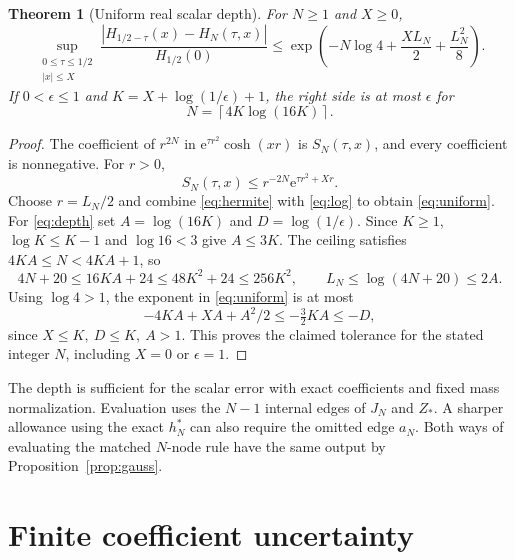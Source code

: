 \documentclass[11pt]{article}
\numberwithin{equation}{section}
\newtheorem{theorem}{Theorem}[section]
\newcommand{\ee}{\mathrm e}
\begin{document}
\begin{theorem}[Uniform real scalar depth]\label{thm:depth}
For \(N\ge1\) and \(X\ge0\),
\begin{equation}\label{eq:uniform}
 \sup_{\substack{0\le\tau\le 1/2\\ |x|\le X}}
 \frac{|H_{1/2-\tau}(x)-H_N(\tau,x)|}{H_{1/2}(0)}
 \le \exp\left(-N\log4+\frac{XL_N}{2}+\frac{L_N^2}{8}\right).
\end{equation}
If \(0<\epsilon\le1\) and \(K=X+\log(1/\epsilon)+1\), the
right side is at most \(\epsilon\) for
\begin{equation}\label{eq:depth}
 N=\left\lceil4K\log(16K)\right\rceil .
\end{equation}
\end{theorem}
\begin{proof}
The coefficient of \(r^{2N}\) in \(\ee^{\tau r^2}\cosh(xr)\)
is \(S_N(\tau,x)\), and every coefficient is nonnegative.
For \(r>0\),
\[
 S_N(\tau,x)\le r^{-2N}\ee^{\tau r^2+Xr}.
\]
Choose \(r=L_N/2\) and combine \eqref{eq:hermite} with
\eqref{eq:log} to obtain \eqref{eq:uniform}. For
\eqref{eq:depth} set \(A=\log(16K)\) and \(D=\log(1/\epsilon)\).
Since \(K\ge1\), \(\log K\le K-1\) and \(\log16<3\) give
\(A\le3K\). The ceiling satisfies \(4KA\le N<4KA+1\), so
\[
 4N+20\le16KA+24\le48K^2+24\le256K^2,\qquad
 L_N\le\log(4N+20)\le 2A .
\]
Using \(\log4>1\), the exponent in \eqref{eq:uniform}
is at most
\[
 -4KA+XA+A^2/2\le-\tfrac32 KA\le-D,
\]
since \(X\le K,\ D\le K,\ A>1\). This proves the claimed
tolerance for the stated integer \(N\), including \(X=0\)
or \(\epsilon=1\).
\end{proof}

The depth is sufficient for the scalar error with exact
coefficients and fixed mass normalization. Evaluation uses the
\(N-1\) internal edges of \(J_N\) and \(Z_*\). A sharper allowance
using the exact \(h_N^*\) can also require the omitted edge \(a_N\).
Both ways of evaluating the matched \(N\)-node rule have the same
output by Proposition~\ref{prop:gauss}.

\section{Finite coefficient uncertainty}\label{sec:uncertainty}
\end{document}
